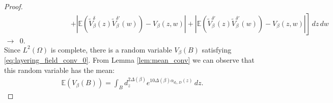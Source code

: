\documentclass[a4paper, 11pt, reqno]{amsart}
\theoremstyle{definition} \newtheorem{defn}{Definition}[section]
\theoremstyle{remark} \newtheorem{rem}[defn]{Remark}
\theoremstyle{remark} \newtheorem*{rem*}{Remark}
\theoremstyle{plain} \newtheorem{thm}[defn]{Theorem}
\theoremstyle{plain} \newtheorem{lem}[defn]{Lemma}
\theoremstyle{plain} \newtheorem{prop}[defn]{Proposition}
\theoremstyle{plain} \newtheorem{cor}[defn]{Corollary}
\theoremstyle{remark} \newtheorem{exm}[defn]{\textbf{Example}}
\theoremstyle{remark} \newtheorem{exms}[defn]{\textbf{Examples}}
\theoremstyle{remark} \newtheorem*{bl}{}
\numberwithin{equation}{section} %
\newcommand{\mc}{\mathcal}
\newcommand{\E}{\mathbb{E}}
\newcommand{\ind}{\mathbf{1}}
\newcommand{\clpl}{\color{purple} }
\begin{document}
\begin{proof}
\begin{align}
			& \hspace{3cm} \left. + | \E(\tilde{V}^{\delta}_{\beta}(z)\tilde{V}^{\delta'}_{\beta}(w))  - V_{\beta}(z,w) | + |\E(\tilde{V}^{\delta'}_{\beta}(z) \tilde{V}^{\delta'}_{\beta}(w)) - V_{\beta}(z,w) | \right]\, dz  \, dw 
			\nonumber \\
			\to & 0.
		\end{align}	
		Since $L^2(\Omega)$ is complete, there is a random variable $V_{\beta}(B)$ satisfying \eqref{eq:layering_field_conv_0}. From Lemma \ref{lem:mean_conv} we can observe that this random variable has the mean:
		\begin{align}\label{eq:layering_field_conv_3}
			\E (V_{\beta}(B)) = \int_B d_z^{2\Delta(\beta)} e^{10\Delta(\beta) \alpha_{d_z, D}(z)} \, dz.
		\end{align}
		

		

\end{proof}
\end{document}
